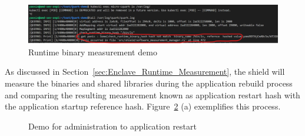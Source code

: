 \begin{figure}[!htb]
    \centering
    \includegraphics[width=1\textwidth]{images/cquark_runtime_runtime_binary_measurement_demo.png}
    \caption[Runtime binary measurement demo]{Runtime binary measurement demo}
    \label{fig:cquark_runtime_runtime_binary_measurement_demo}
\end{figure}







As discussed in Section~\ref{sec:Enclave_Runtime_Measurement}, the shield will measure the binaries and shared libraries during the application rebuild process and comparing the resulting measurement known as application restart hash with the application startup reference hash. Figure~\ref{fig:cquark_application_restart_demo} (a)
exemplifies this process.
\begin{figure}[!htb]

  
    \caption[Demo for  administration to application restart]{Demo for administration to application restart}
    \label{fig:cquark_application_restart_demo}
\end{figure}

